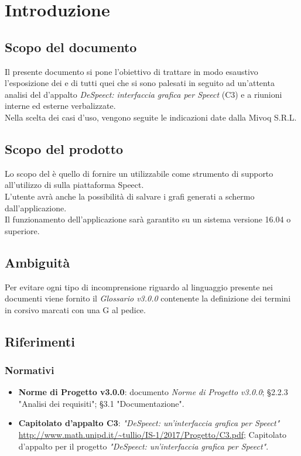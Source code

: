 \documentclass[./AnalisideiRequisiti.tex]{subfiles}
\begin{document}
	
\chapter{Introduzione}
\section{Scopo del documento}
Il presente documento si pone l’obiettivo di trattare in modo esaustivo l’esposizione dei  e di tutti quei  che si sono palesati in seguito ad un’attenta analisi del  d’appalto \textit{DeSpeect: interfaccia grafica per Speect} (C3) e a riunioni interne ed esterne verbalizzate.
\\ \noindent Nella scelta dei casi d'uso, vengono seguite le indicazioni date dalla  Mivoq S.R.L.

\section{Scopo del prodotto}

Lo scopo del  è quello di fornire un  utilizzabile come strumento di supporto all'utilizzo di  sulla piattaforma Speect. 
\\ \noindent L'utente avrà anche la possibilità di salvare i grafi generati a schermo dall'applicazione.
\\ \noindent Il funzionamento dell'applicazione sarà garantito su un sistema  versione 16.04 o superiore.

\section{Ambiguità}
Per evitare ogni tipo di incomprensione riguardo al linguaggio presente nei documenti viene fornito il \textit{Glossario v3.0.0} contenente la definizione dei termini in corsivo marcati con una G al pedice.

\section{Riferimenti}
\subsection*{Normativi}
\begin{itemize}
	\item \textbf{Norme di Progetto v3.0.0}: documento \textit{Norme di Progetto v3.0.0};
	\subitem §2.2.3 "Analisi dei requisiti";
	\subitem §3.1 "Documentazione".
	\item \textbf{Capitolato d'appalto C3}: \textit{"DeSpeect: un'interfaccia grafica per Speect"} \url{http://www.math.unipd.it/~tullio/IS-1/2017/Progetto/C3.pdf};
	\subitem Capitolato d'appalto per il progetto \textit{"DeSpeect: un'interfaccia grafica per Speect"}.

\end{itemize}
\end{document}

